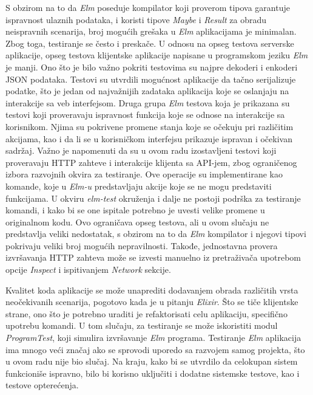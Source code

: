\documentclass[12pt,oneside]{memoir}
\begin{document}
\par S obzirom na to da \emph{Elm} poseduje kompilator koji proverom tipova garantuje ispravnost ulaznih podataka, i koristi tipove \emph{Maybe} i \emph{Result} za obradu neispravnih scenarija, broj mogućih grešaka u \emph{Elm} aplikacijama je minimalan. Zbog toga, testiranje se često i preskače. U odnosu na opseg testova serverske aplikacije, opseg testova klijentske aplikacije napisane u programskom jeziku \emph{Elm} je manji. Ono što je bilo važno pokriti testovima su najpre dekoderi i enkoderi JSON podataka. Testovi su utvrdili mogućnost aplikacije da tačno serijalizuje podatke, što je jedan od najvažnijih zadataka aplikacija koje se oslanjaju na interakcije sa veb interfejsom. Druga grupa \emph{Elm} testova koja je prikazana su testovi koji proveravaju ispravnost funkcija koje se odnose na interakcije sa korisnikom. Njima su pokrivene promene stanja koje se očekuju pri različitim akcijama, kao i da li se u korisničkom interfejsu prikazuje ispravan i očekivan sadržaj. Važno je napomenuti da su u ovom radu izostavljeni testovi koji proveravaju HTTP zahteve i interakcije klijenta sa API-jem, zbog ograničenog izbora razvojnih okvira za testiranje. Ove operacije su implementirane kao komande, koje u \emph{Elm-u} predstavljaju akcije koje se ne mogu predstaviti funkcijama. U okviru \emph{elm-test} okruženja i dalje ne postoji podrška za testiranje komandi, i kako bi se one ispitale potrebno je uvesti velike promene u originalnom kodu. Ovo ograničava opseg testova, ali u ovom slučaju ne predstavlja veliki nedostatak, s obzirom na to da \emph{Elm} kompilator i njegovi tipovi pokrivaju veliki broj mogućih nepravilnosti. Takođe, jednostavna provera izvršavanja HTTP zahteva može se izvesti manuelno iz pretraživača upotrebom opcije \emph{Inspect} i ispitivanjem \emph{Network} sekcije. 
\par Kvalitet koda aplikacije se može unaprediti dodavanjem obrada različitih vrsta neočekivanih scenarija, pogotovo kada je u pitanju \emph{Elixir}. Što se tiče klijentske strane, ono što je potrebno uraditi je refaktorisati celu aplikaciju, specifično upotrebu komandi. U tom slučaju, za testiranje se može iskoristiti modul \emph{ProgramTest}, koji simulira izvršavanje \emph{Elm} programa. Testiranje \emph{Elm} aplikacija ima mnogo veći značaj ako se sprovodi uporedo sa razvojem samog projekta, što u ovom radu nije bio slučaj. Na kraju, kako bi se utvrdilo da celokupan sistem funkcioniše ispravno, bilo bi korisno uključiti i dodatne sistemske testove, kao i testove opterećenja.
\end{document}

